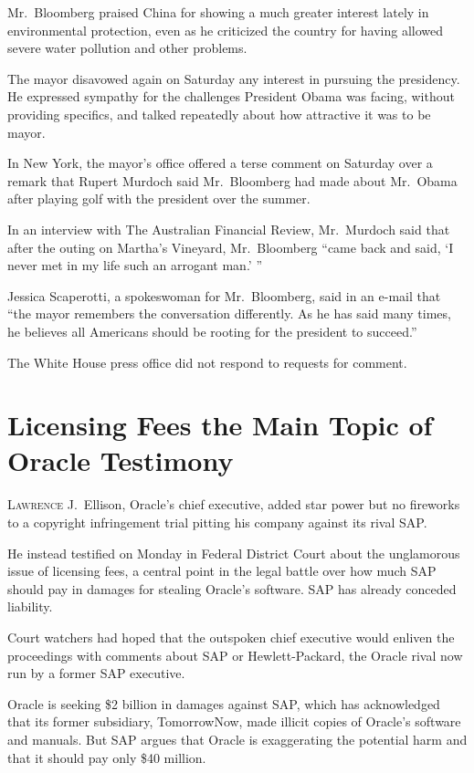 ﻿\documentclass[12pt]{article}
\begin{document}
Mr.~Bloomberg praised China for showing a much greater interest lately in environmental protection,
even as he criticized the country for having allowed severe water pollution and other problems.

The mayor disavowed again on Saturday any interest in pursuing the presidency. He expressed sympathy
for the challenges President Obama was facing, without providing specifics, and talked repeatedly
about how attractive it was to be mayor.

In New York, the mayor's office offered a terse comment on Saturday over a remark that Rupert
Murdoch said Mr.~Bloomberg had made about Mr.~Obama after playing golf with the president over the
summer.

In an interview with The Australian Financial Review, Mr.~Murdoch said that after the outing on
Martha's Vineyard, Mr.~Bloomberg ``came back and said, `I never met in my life such an arrogant
man.' ''

Jessica Scaperotti, a spokeswoman for Mr.~Bloomberg, said in an e-mail that ``the mayor remembers
the conversation differently. As he has said many times, he believes all Americans should be rooting
for the president to succeed.''

The White House press office did not respond to requests for comment.

\section{Licensing Fees the Main Topic of Oracle Testimony}

\lettrine{L}{awrence} J.~Ellison, Oracle's chief executive, added star power
but no fireworks to a copyright infringement trial pitting his company against its rival SAP.

He instead testified on Monday in Federal District Court about the unglamorous issue of licensing
fees, a central point in the legal battle over how much SAP should pay in damages for stealing
Oracle's software. SAP has already conceded liability.

Court watchers had hoped that the outspoken chief executive would enliven the proceedings with
comments about SAP or Hewlett-Packard, the Oracle rival now run by a former SAP executive.

Oracle is seeking \$2 billion in damages against SAP, which has acknowledged that its former
subsidiary, TomorrowNow, made illicit copies of Oracle's software and manuals. But SAP argues that
Oracle is exaggerating the potential harm and that it should pay only \$40 million.
\end{document}
